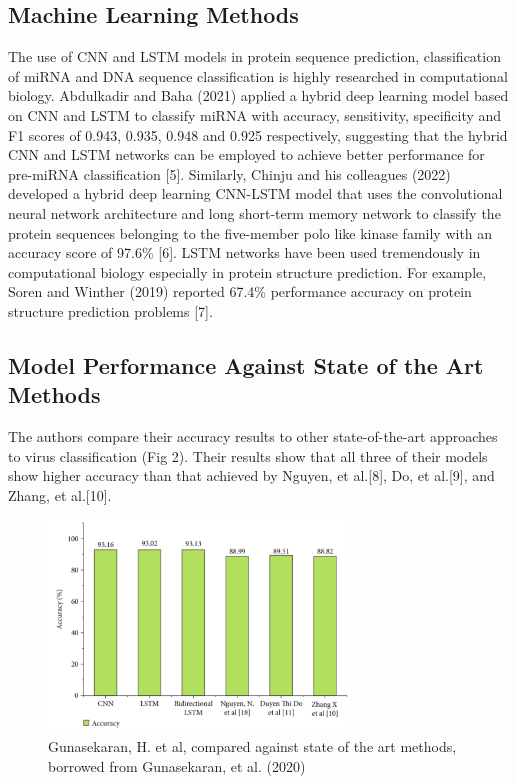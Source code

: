\documentclass[journal]{IEEEtran}
\begin{document}
  \subsection{Machine Learning Methods}
    The use of CNN and LSTM models in protein sequence prediction, classification of miRNA and DNA sequence classification is 
    highly researched in computational biology. Abdulkadir and Baha (2021) applied a hybrid deep learning model based on 
    CNN and LSTM to classify miRNA with accuracy, sensitivity, specificity and F1 scores of 0.943, 0.935, 0.948 and 0.925 respectively, 
    suggesting that the hybrid CNN and LSTM networks can be employed to achieve better performance for pre-miRNA classification [5].
    Similarly, Chinju and his colleagues (2022) developed a hybrid deep learning CNN-LSTM model that uses the 
    convolutional neural network architecture and long short-term memory network to classify the protein sequences belonging to 
    the five-member polo like kinase family with an accuracy score of 97.6\% [6]. 
    LSTM networks have been used tremendously in computational biology especially in protein structure prediction. 
    For example, Soren and Winther (2019) reported 67.4\% performance accuracy on protein structure prediction problems [7].

\subsection{Model Performance Against State of the Art Methods}

  The authors compare their accuracy results to other state-of-the-art approaches to 
  virus classification (Fig 2). Their results show that all three of their models show higher accuracy than
  that achieved by Nguyen, et al.[8], Do, et al.[9], and Zhang, et al.[10].

  \begin{figure}
    \centering
    \includegraphics[width=8cm]{figures/accuracy_compared_to_state_of_art.png}
    \caption{Gunasekaran, H. et al, compared against state of the art methods, borrowed from Gunasekaran, et al. (2020)}
  \end{figure}
\end{document}
